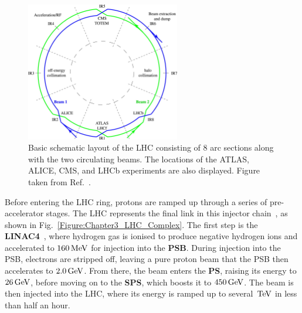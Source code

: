 \begin{figure}[!htbp]
\centering
\includegraphics[width= 0.6\textwidth]{Figures/Chapter3/LHC_BasicLayout.jpg}
\caption[Basic schematic layout of the Large Hadron Collider]{Basic schematic layout of the \ac{LHC} consisting of 8 arc sections along with the two circulating beams. The locations of the ATLAS, ALICE, \ac{CMS}, and LHCb experiments are also displayed. Figure taken from Ref.~\cite{LHC_BasicLayout}.}
\label{Figure:Chapter3_LHC_BasicLayout}
\end{figure}

Before entering the \ac{LHC} ring, protons are ramped up through a series of pre-accelerator stages. The \ac{LHC} represents the final link in this injector chain~\cite{LHC_InjectorComplex}, as shown in Fig.~\ref{Figure:Chapter3_LHC_Complex}. The first step is the \textbf{\ac{LINAC4}}~\cite{LINAC4}, where hydrogen gas is ionised to produce negative hydrogen ions and accelerated to $160\,\text{Me\hspace{-.08em}V}$ for injection into the \textbf{\ac{PSB}}. During injection into the \ac{PSB}, electrons are stripped off, leaving a pure proton beam that the \ac{PSB} then accelerates to $2.0\,\text{Ge\hspace{-.08em}V}$. From there, the beam enters the \textbf{\ac{PS}}, raising its energy to $26\,\text{Ge\hspace{-.08em}V}$, before moving on to the \textbf{\ac{SPS}}, which boosts it to $450\,\text{Ge\hspace{-.08em}V}$. The beam is then injected into the \ac{LHC}, where its energy is ramped up to several $\,\text{Te\hspace{-.08em}V}$ in less than half an hour.


